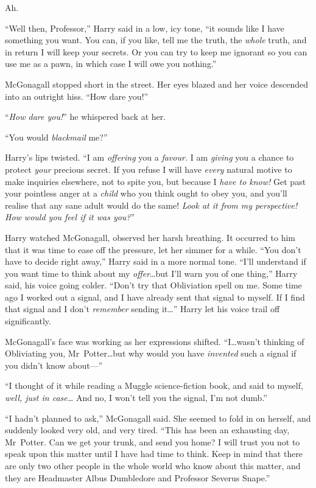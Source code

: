 Ah.

“Well then, Professor,” Harry said in a low, icy tone, “it sounds like I have something you want. You can, if you like, tell me the truth, the \emph{whole} truth, and in return I will keep your secrets. Or you can try to keep me ignorant so you can use me as a pawn, in which case I will owe you nothing.”

McGonagall stopped short in the street. Her eyes blazed and her voice descended into an outright hiss. “How dare you!”

“\emph{How dare you!}” he whispered back at her.

“You would \emph{blackmail} me?”

Harry’s lips twisted. “I am \emph{offering} you a \emph{favour.} I am \emph{giving} you a chance to protect \emph{your} precious secret. If you refuse I will have \emph{every} natural motive to make inquiries elsewhere, not to spite you, but because I \emph{have to know!} Get past your pointless anger at a \emph{child} who you think ought to obey you, and you’ll realise that any sane adult would do the same! \emph{Look at it from my perspective! How would you feel if it was \emph{you?}}”

Harry watched McGonagall, observed her harsh breathing. It occurred to him that it was time to ease off the pressure, let her simmer for a while. “You don’t have to decide right away,” Harry said in a more normal tone. “I’ll understand if you want time to think about my \emph{offer}…but I’ll warn you of one thing,” Harry said, his voice going colder. “Don’t try that Obliviation spell on me. Some time ago I worked out a signal, and I have already sent that signal to myself. If I find that signal and I don’t \emph{remember} sending it…” Harry let his voice trail off significantly.

McGonagall’s face was working as her expressions shifted. “I…wasn’t thinking of Obliviating you, Mr~Potter…but why would you have \emph{invented} such a signal if you didn’t know about—”

“I thought of it while reading a Muggle science-fiction book, and said to myself, \emph{well, just in case…} And no, I won’t tell you the signal, I’m not dumb.”

“I hadn’t planned to ask,” McGonagall said. She seemed to fold in on herself, and suddenly looked very old, and very tired. “This has been an exhausting day, Mr~Potter. Can we get your trunk, and send you home? I will trust you not to speak upon this matter until I have had time to think. Keep in mind that there are only two other people in the whole world who know about this matter, and they are Headmaster Albus Dumbledore and Professor Severus Snape.”

